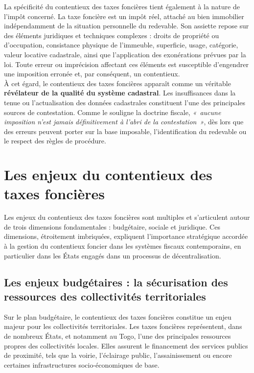 \documentclass[Cours_contentieuxTF2026.tex]{subfiles}
\begin{document}
\noindent La spécificité du contentieux des taxes foncières tient également à la nature de l’impôt concerné. 
La taxe foncière est un impôt réel, attaché au bien immobilier indépendamment de la situation 
personnelle du redevable. Son assiette repose sur des éléments juridiques et techniques complexes : 
droits de propriété ou d’occupation, consistance physique de l’immeuble, superficie, usage, 
catégorie, valeur locative cadastrale, ainsi que l’application des exonérations prévues par la loi. 
Toute erreur ou imprécision affectant ces éléments est susceptible d’engendrer une imposition 
erronée et, par conséquent, un contentieux.\\

\noindent À cet égard, le contentieux des taxes foncières apparaît comme un véritable \textbf{révélateur de la 
	qualité du système cadastral}. Les insuffisances dans la tenue ou l’actualisation des données 
cadastrales constituent l’une des principales sources de contestation. Comme le souligne la 
doctrine fiscale, \emph{«~aucune imposition n’est jamais définitivement à l’abri de la contestation~»}, 
dès lors que des erreurs peuvent porter sur la base imposable, l’identification du redevable ou le 
respect des règles de procédure.

\section*{Les enjeux du contentieux des taxes foncières}

Les enjeux du contentieux des taxes foncières sont multiples et s’articulent autour de trois dimensions
fondamentales : budgétaire, sociale et juridique. Ces dimensions, étroitement imbriquées, expliquent
l’importance stratégique accordée à la gestion du contentieux foncier dans les systèmes fiscaux
contemporains, en particulier dans les États engagés dans un processus de décentralisation.

\subsection*{Les enjeux budgétaires : la sécurisation des ressources des collectivités territoriales}

Sur le plan budgétaire, le contentieux des taxes foncières constitue un enjeu majeur pour les
collectivités territoriales. Les taxes foncières représentent, dans de nombreux États, et notamment
au Togo, l’une des principales ressources propres des collectivités locales. Elles assurent le
financement des services publics de proximité, tels que la voirie, l’éclairage public, l’assainissement
ou encore certaines infrastructures socio-économiques de base.
\end{document}
